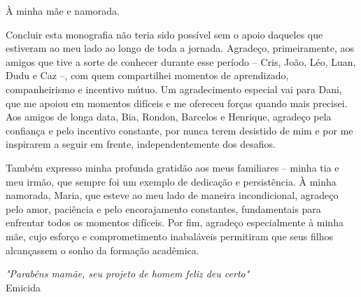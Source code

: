 \documentclass[embeddedlogo, nohidelinks, arial]{ufsc-thesis-rn46-2019}
\theoremstyle{definition}
\begin{document}

\pretextual%
\imprimircapa%
\imprimirfolhaderosto*
\protect{}
\imprimirfolhadecertificacao

\begin{dedicatoria}
À minha mãe e namorada.
\end{dedicatoria}

\begin{agradecimentos}
  Concluir esta monografia não teria sido possível sem o apoio daqueles que estiveram ao meu lado ao longo de toda a jornada. Agradeço, primeiramente, aos amigos que tive a sorte de conhecer durante esse período – Cris, João, Léo, Luan, Dudu e Caz –, com quem compartilhei momentos de aprendizado, companheirismo e incentivo mútuo. Um agradecimento especial vai para Dani, que me apoiou em momentos difíceis e me ofereceu forças quando mais precisei. Aos amigos de longa data, Bia, Rondon, Barcelos e Henrique, agradeço pela confiança e pelo incentivo constante, por nunca terem desistido de mim e por me inspirarem a seguir em frente, independentemente dos desafios.

  Também expresso minha profunda gratidão aos meus familiares – minha tia e meu irmão, que sempre foi um exemplo de dedicação e persistência. À minha namorada, Maria, que esteve ao meu lado de maneira incondicional, agradeço pelo amor, paciência e pelo encorajamento constantes, fundamentais para enfrentar todos os momentos difíceis. Por fim, agradeço especialmente à minha mãe, cujo esforço e comprometimento inabaláveis permitiram que seus filhos alcançassem o sonho da formação acadêmica.
\end{agradecimentos}

\begin{epigrafe}
\textit{"Parabéns mamãe, seu projeto de homem feliz deu certo"} \\ Emicida
\end{epigrafe}
\end{document}
